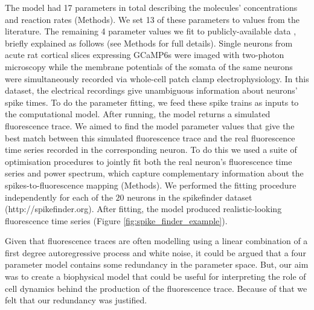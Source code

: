 The model had 17 parameters in total describing the molecules’ concentrations and reaction rates (Methods). We set 13 of these parameters to values from the literature. The remaining 4 parameter values we fit to publicly-available data  \parencite{berens}, briefly explained as follows (see Methods for full details).  Single neurons from acute rat cortical slices expressing GCaMP6s were imaged with two-photon microscopy while the membrane potentials of the somata of the same neurons were simultaneously recorded via whole-cell patch clamp electrophysiology. In this dataset, the electrical recordings give unambiguous information about neurons' spike times. To do the parameter fitting, we feed these spike trains as inputs to the computational model. After running, the model returns a simulated fluorescence trace. We aimed to find the model parameter values that give the best match between this simulated fluorescence trace and the real fluorescence time series recorded in the corresponding neuron. To do this we used a suite of optimisation procedures to jointly fit both the real neuron’s fluorescence time series and power spectrum, which capture complementary information about the spikes-to-fluorescence mapping (Methods). We performed the fitting procedure independently for each of the $20$ neurons in the spikefinder dataset (http://spikefinder.org). After fitting, the model produced realistic-looking fluorescence time series (Figure \ref{fig:spike_finder_example}).

Given that fluorescence traces are often modelling using a linear combination of a first degree autoregressive process and white noise, it could be argued that a four parameter model contains some redundancy in the parameter space. But, our aim was to create a biophysical model that could be useful for interpreting the role of cell dynamics behind the production of the fluorescence trace. Because of that we felt that our redundancy was justified.

